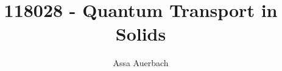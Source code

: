 \documentclass[]{article}
\title{118028 - Quantum Transport in Solids}
\author{Assa Auerbach}
\theoremstyle{bluestyle}
\theoremstyle{redstyle}
\theoremstyle{magentastyle}
\theoremstyle{olivestyle}
\theoremstyle{olivestyle}
\begin{document}
\maketitle

\begin{abstract}

\end{abstract}




\end{document}
